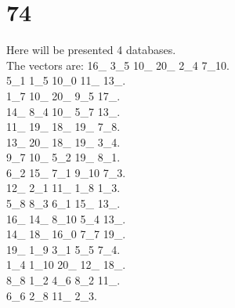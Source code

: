 \chapter{74}
\indent Here will be presented 4 databases.\\
The vectors are:
16\_ 3\_5 10\_ 20\_ 2\_4 7\_10.\\5\_1 1\_5 10\_0 11\_ 13\_.\\1\_7 10\_ 20\_ 9\_5 17\_.\\14\_ 8\_4 10\_ 5\_7 13\_.\\11\_ 19\_ 18\_ 19\_ 7\_8.\\13\_ 20\_ 18\_ 19\_ 3\_4.\\9\_7 10\_ 5\_2 19\_ 8\_1.\\6\_2 15\_ 7\_1 9\_10 7\_3.\\12\_ 2\_1 11\_ 1\_8 1\_3.\\5\_8 8\_3 6\_1 15\_ 13\_.\\16\_ 14\_ 8\_10 5\_4 13\_.\\14\_ 18\_ 16\_0 7\_7 19\_.\\19\_ 1\_9 3\_1 5\_5 7\_4.\\1\_4 1\_10 20\_ 12\_ 18\_.\\8\_8 1\_2 4\_6 8\_2 11\_.\\6\_6 2\_8 11\_ 2\_3.\\